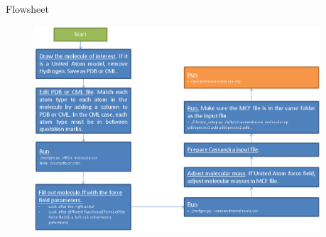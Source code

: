 \documentclass{beamer}
\begin{document}
\begin{frame}{Flowsheet}
\begin{figure}
\begin{center}
\includegraphics[height=3in]{simulationsetup_betarelease.eps}
\end{center}
\end{figure}
\end{frame}
\end{document}
